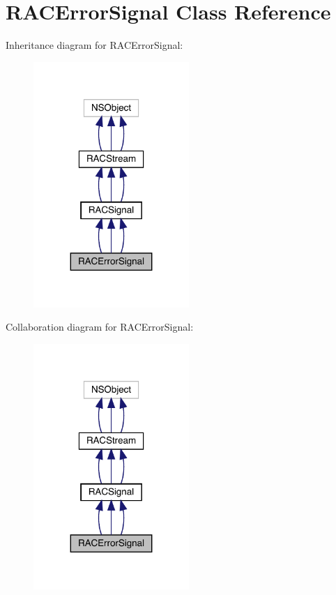 \hypertarget{interface_r_a_c_error_signal}{}\section{R\+A\+C\+Error\+Signal Class Reference}
\label{interface_r_a_c_error_signal}


Inheritance diagram for R\+A\+C\+Error\+Signal\+:\nopagebreak
\begin{figure}[H]
\begin{center}
\leavevmode
\includegraphics[width=167pt]{interface_r_a_c_error_signal__inherit__graph}
\end{center}
\end{figure}


Collaboration diagram for R\+A\+C\+Error\+Signal\+:\nopagebreak
\begin{figure}[H]
\begin{center}
\leavevmode
\includegraphics[width=167pt]{interface_r_a_c_error_signal__coll__graph}
\end{center}
\end{figure}
